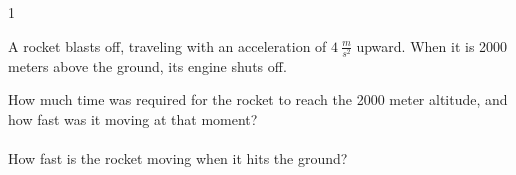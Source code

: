 
\AddToShipoutPicture*{\BackgroundPic}

\addtocounter {ProbNum} {1}

 
{\bf \Large{}} A rocket blasts off, traveling with an acceleration of ${4~\tfrac{m}{s^2}}$ upward.  When it is 2000 meters above the ground, its engine shuts off. \bigskip

How much time was required for the rocket to reach the 2000 meter altitude, and how fast was it moving at that moment? \paragraph{}
\noindent
\vfill

How fast is the rocket moving when it hits the ground?


\vfill
\newpage